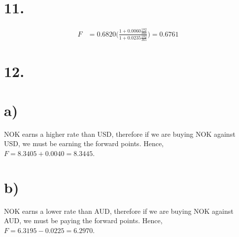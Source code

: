\documentclass[paper=a4, fontsize=11pt]{scrartcl} %
\numberwithin{equation}{section} %
\numberwithin{figure}{section} %
\numberwithin{table}{section} %
\begin{document}

\section*{11.}

\begin{align*}
F &= 0.6820 \Bigg(\frac{1+0.0060\frac{182}{360}}{1+0.0235\frac{182}{365}} \Bigg) = 0.6761
\end{align*}


\section*{12.}


\section*{a)}

NOK earns a higher rate than USD, therefore if we are buying NOK against USD, we must be earning the forward points.  Hence, $F = 8.3405+0.0040 = 8.3445$.


\section*{b)}

NOK earns a lower rate than AUD, therefore if we are buying NOK against AUD, we must be paying the forward points.  Hence, $F = 6.3195 - 0.0225 = 6.2970$.

\end{document}
